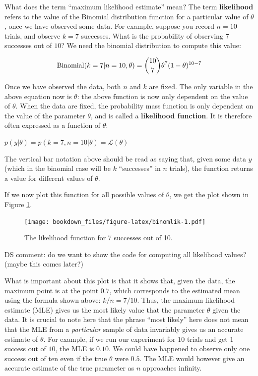 \documentclass[12pt,]{krantz}
\makeatletter
\newenvironment{kframe}{%
\medskip{}
\setlength{\fboxsep}{.8em}
 \def\at@end@of@kframe{}%
 \ifinner\ifhmode%
  \def\at@end@of@kframe{\end{minipage}}%
  \begin{minipage}{\columnwidth}%
 \fi\fi%
 \def\FrameCommand##1{\hskip\@totalleftmargin \hskip-\fboxsep
 \colorbox{shadecolor}{##1}\hskip-\fboxsep
     \hskip-\linewidth \hskip-\@totalleftmargin \hskip\columnwidth}%
 \MakeFramed {\advance\hsize-\width
   \@totalleftmargin\z@ \linewidth\hsize
   \@setminipage}}%
 {\par\unskip\endMakeFramed%
 \at@end@of@kframe}
\newenvironment{rmdblock}[1]
  {
  \begin{itemize}
  \renewcommand{\labelitemi}{
    \raisebox{-.7\height}[0pt][0pt]{
      {\setkeys{Gin}{width=3em,keepaspectratio}\texttt{[image: images/\#1]}}
    }
  }
  \setlength{\fboxsep}{1em}
  \begin{kframe}
  \item
  }
  {
  \end{kframe}
  \end{itemize}
  }
\newenvironment{rmdnote}
  {\begin{rmdblock}{note}}
  {\end{rmdblock}}
\makeatother
\begin{document}
What does the term ``maximum likelihood estimate'' mean? The term \textbf{likelihood} refers to the value of the Binomial distribution function for a particular value of \(\theta\), once we have observed some data. For example, suppose you record \(n=10\) trials, and observe \(k=7\) successes. What is the probability of observing \(7\) successes out of \(10\)? We need the binomial distribution to compute this value:

\begin{equation}
\hbox{Binomial}(k=7|n=10,\theta) = 
\binom{10}{7} \theta^{7} (1-\theta)^{10-7}
\end{equation}

Once we have observed the data, both \(n\) and \(k\) are fixed. The only variable in the above equation now is \(\theta\): the above function is now only dependent on the value of \(\theta\). When the data are fixed, the probability mass function is only dependent on the value of the parameter \(\theta\), and is called a \textbf{likelihood function}. It is therefore often expressed as a function of \(\theta\):

\(p( y | \theta ) = p( k=7, n=10 | \theta) = \mathcal{L}(\theta)\)

The vertical bar notation above should be read as saying that, given some data \(y\) (which in the binomial case will be \(k\) ``successes'' in \(n\) trials), the function returns a value for different values of \(\theta\).

If we now plot this function for all possible values of \(\theta\), we get the plot shown in Figure \ref{fig:binomlik}.

\begin{figure}
\centering
\texttt{[image: bookdown\_files/figure-latex/binomlik-1.pdf]}
\caption{\label{fig:binomlik}The likelihood function for 7 successes out of 10.}
\end{figure}

\begin{rmdnote}
DS comment: do we want to show the code for computing all likelihood values? (maybe this comes later?)
\end{rmdnote}

What is important about this plot is that it shows that, given the data, the maximum point is at the point \(0.7\), which corresponds to the estimated mean using the formula shown above: \(k/n = 7/10\). Thus, the maximum likelihood estimate (MLE) gives us the most likely value that the parameter \(\theta\) given the data. It is crucial to note here that the phrase ``most likely'' here does not mean that the MLE from a \emph{particular} sample of data invariably gives us an accurate estimate of \(\theta\). For example, if we run our experiment for \(10\) trials and get \(1\) success out of \(10\), the MLE is \(0.10\). We could have happened to observe only one success out of ten even if the true \(\theta\) were \(0.5\). The MLE would however give an accurate estimate of the true parameter as \(n\) approaches infinity.
\end{document}
